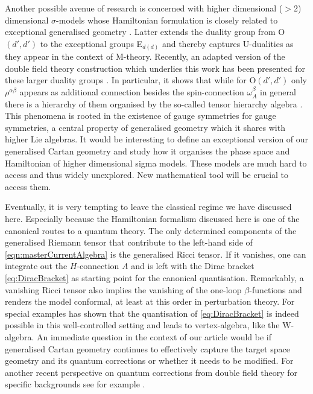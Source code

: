 \documentclass[11pt,a4paper]{article}
\numberwithin{equation}{section}
\begin{document}
Another possible avenue of research is concerned with higher dimensional ($>$2) dimensional $\sigma$-models whose Hamiltonian formulation is closely related to exceptional generalised geometry \cite{Hatsuda:2012vm,Hatsuda:2012uk,Hatsuda:2013dya,Duff:2015jka,Sakatani:2020iad,Osten:2021fil,Osten:2024mjt}. Latter extends the duality group from O$(d',d')$ to the exceptional groups E$_{d(d)}$ and thereby captures U-dualities as they appear in the context of M-theory. Recently, an adapted version of the double field theory construction which underlies this work has been presented for these larger duality groups \cite{Hassler:2023axp}. In particular, it shows that while for O$(d',d')$ only $\rho^{\alpha\beta}$ appears as additional connection besides the spin-connection $\omega^\beta_A$ in general there is a hierarchy of them organised by the so-called tensor hierarchy algebra \cite{deWit:2008ta,Riccioni:2009xr}. This phenomena is rooted in the existence of gauge symmetries for gauge symmetries, a central property of generalised geometry which it shares with higher Lie algebras. It would be interesting to define an exceptional version of our generalised Cartan geometry and study how it organises the phase space and Hamiltonian of higher dimensional sigma models. These models are much hard to access and thus widely unexplored. New mathematical tool will be crucial to access them.

Eventually, it is very tempting to leave the classical regime we have discussed here. Especially because the Hamiltonian formalism discussed here is one of the canonical routes to a quantum theory. The only determined components of the generalised Riemann tensor that contribute to the left-hand side of \eqref{eqn:masterCurrentAlgebra} is the generalised Ricci tensor. If it vanishes, one can integrate out the $H$-connection $A$ and is left with the Dirac bracket \eqref{eq:DiracBracket} as starting point for the canonical quantisation. Remarkably, a vanishing Ricci tensor also implies the vanishing of the one-loop $\beta$-functions and renders the model conformal, at least at this order in perturbation theory. For special examples \cite{Lacroix:2023ybi} has shown that the quantisation of \eqref{eq:DiracBracket} is indeed possible in this well-controlled setting and leads to vertex-algebra, like the W-algebra. An immediate question in the context of our article would be if generalised Cartan geometry continues to effectively capture the target space geometry and its quantum corrections or whether it needs to be modified. For another recent perspective on quantum corrections from double field theory for specific backgrounds see for example \cite{Lunin:2024vsx}.
\end{document}
